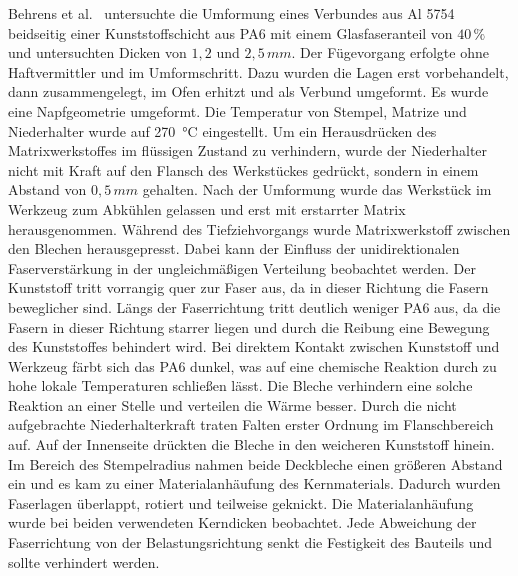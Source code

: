 Behrens et al.~\cite{Behrens2014} untersuchte die Umformung eines Verbundes aus Al 5754 beidseitig einer Kunststoffschicht aus PA6 mit einem Glasfaseranteil von $40\,\%$ und untersuchten Dicken von $1,2$ und $2,5 \, mm$.
Der Fügevorgang erfolgte ohne Haftvermittler und im Umformschritt.
Dazu wurden die Lagen erst vorbehandelt, dann zusammengelegt, im Ofen erhitzt und als Verbund umgeformt.
Es wurde eine Napfgeometrie umgeformt.
Die Temperatur von Stempel, Matrize und Niederhalter wurde auf \SI{270}{\degreeCelsius} eingestellt.
Um ein Herausdrücken des Matrixwerkstoffes im flüssigen Zustand zu verhindern, wurde der Niederhalter nicht mit Kraft auf den Flansch des Werkstückes gedrückt, sondern in einem Abstand von $0,5\,mm$ gehalten.
Nach der Umformung wurde das Werkstück im Werkzeug zum Abkühlen gelassen und erst mit erstarrter Matrix herausgenommen.
Während des Tiefziehvorgangs wurde Matrixwerkstoff zwischen den Blechen herausgepresst.
Dabei kann der Einfluss der unidirektionalen Faserverstärkung in der ungleichmäßigen Verteilung beobachtet werden.
Der Kunststoff tritt vorrangig quer zur Faser aus, da in dieser Richtung die Fasern beweglicher sind.
Längs der Faserrichtung tritt deutlich weniger PA6 aus, da die Fasern in dieser Richtung starrer liegen und durch die Reibung eine Bewegung des Kunststoffes behindert wird.
Bei direktem Kontakt zwischen Kunststoff und Werkzeug färbt sich das PA6 dunkel, was auf eine chemische Reaktion durch zu hohe lokale Temperaturen schließen lässt.
Die Bleche verhindern eine solche Reaktion an einer Stelle und verteilen die Wärme besser.
Durch die nicht aufgebrachte Niederhalterkraft traten Falten erster Ordnung im Flanschbereich auf.
Auf der Innenseite drückten die Bleche in den weicheren Kunststoff hinein.
Im Bereich des Stempelradius nahmen beide Deckbleche einen größeren Abstand ein und es kam zu einer Materialanhäufung des Kernmaterials.
Dadurch wurden Faserlagen überlappt, rotiert und teilweise geknickt.
Die Materialanhäufung wurde bei beiden verwendeten Kerndicken beobachtet.
Jede Abweichung der Faserrichtung von der Belastungsrichtung senkt die Festigkeit des Bauteils und sollte verhindert werden.

